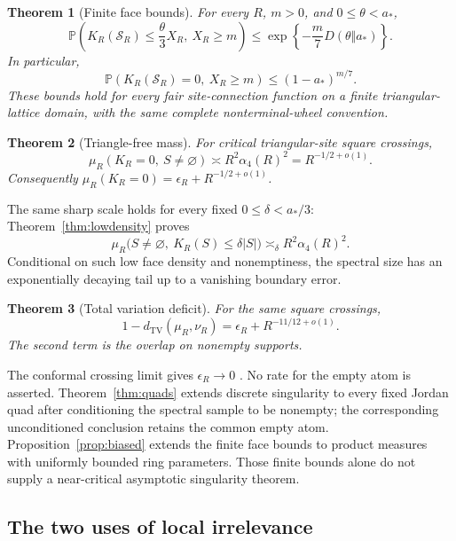 \documentclass[11pt]{amsart}
\newtheorem{theorem}{Theorem}[section]
\theoremstyle{remark}
\newcommand{\Prob}{\mathbb P}
\newcommand{\cS}{\mathcal S}
\newcommand{\TV}{d_{\mathrm{TV}}}
\newcommand{\astar}{a_*}
\begin{document}
\begin{theorem}[Finite face bounds]\label{thm:finite}
For every $R$, $m>0$, and $0\le\theta<\astar$,
\begin{equation}\label{eq:density}
 \Prob\left(K_R(\cS_R)\le\frac{\theta}{3}X_R,\ X_R\ge m\right)
 \le\exp\left\{-\frac{m}{7}D(\theta\Vert\astar)\right\}.
\end{equation}
In particular,
\begin{equation}\label{eq:noface}
 \Prob(K_R(\cS_R)=0,\ X_R\ge m)\le(1-\astar)^{m/7}.
\end{equation}
These bounds hold for every fair site-connection function on a finite triangular-lattice domain, with the same complete nonterminal-wheel convention.
\end{theorem}

\begin{theorem}[Triangle-free mass]\label{thm:rate}
For critical triangular-site square crossings,
\begin{equation}\label{eq:rate}
 \mu_R(K_R=0,\ S\ne\varnothing)
 \asymp R^2\alpha_4(R)^2=R^{-1/2+o(1)}.
\end{equation}
Consequently $\mu_R(K_R=0)=\epsilon_R+R^{-1/2+o(1)}$.
\end{theorem}

The same sharp scale holds for every fixed $0\le\delta<\astar/3$: Theorem~\ref{thm:lowdensity} proves
\[
 \mu_R\bigl(S\ne\varnothing,\ K_R(S)\le\delta|S|\bigr)
 \asymp_\delta R^2\alpha_4(R)^2.
\]
Conditional on such low face density and nonemptiness, the spectral size has an exponentially decaying tail up to a vanishing boundary error.

\begin{theorem}[Total variation deficit]\label{thm:TVrate}
For the same square crossings,
\[
 1-\TV(\mu_R,\nu_R)=\epsilon_R+R^{-11/12+o(1)}.
\]
The second term is the overlap on nonempty supports.
\end{theorem}

The conformal crossing limit gives $\epsilon_R\to0$ \cite{Smirnov}. No rate for the empty atom is asserted. Theorem~\ref{thm:quads} extends discrete singularity to every fixed Jordan quad after conditioning the spectral sample to be nonempty; the corresponding unconditioned conclusion retains the common empty atom. Proposition~\ref{prop:biased} extends the finite face bounds to product measures with uniformly bounded ring parameters. Those finite bounds alone do not supply a near-critical asymptotic singularity theorem.

\subsection{The two uses of local irrelevance}
\end{document}
